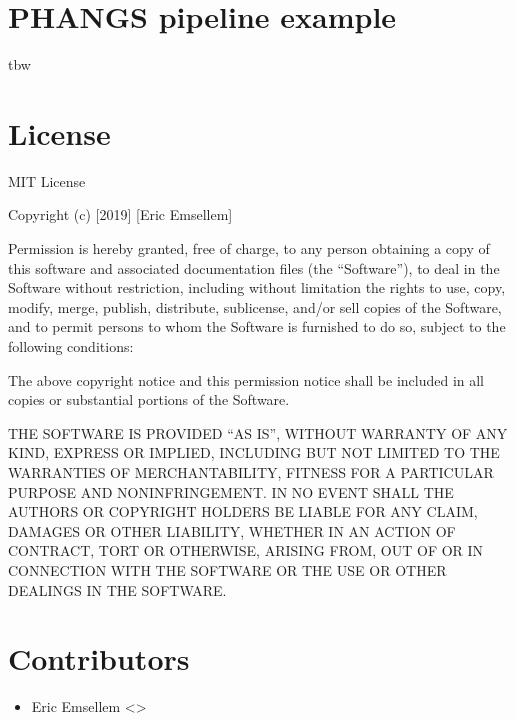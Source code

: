 \documentclass[letterpaper,10pt,english]{sphinxmanual}
\begin{document}
\sphinxstepscope


\section{PHANGS pipeline example}
\label{\detokenize{phangs_example:phangs-pipeline-example}}\label{\detokenize{phangs_example::doc}}
\sphinxAtStartPar
tbw

\sphinxstepscope


\section{License}
\label{\detokenize{license:license}}\label{\detokenize{license:id1}}\label{\detokenize{license::doc}}
\sphinxAtStartPar
MIT License

\sphinxAtStartPar
Copyright (c) {[}2019{]} {[}Eric Emsellem{]}

\sphinxAtStartPar
Permission is hereby granted, free of charge, to any person obtaining a copy
of this software and associated documentation files (the “Software”), to deal
in the Software without restriction, including without limitation the rights
to use, copy, modify, merge, publish, distribute, sublicense, and/or sell
copies of the Software, and to permit persons to whom the Software is
furnished to do so, subject to the following conditions:

\sphinxAtStartPar
The above copyright notice and this permission notice shall be included in all
copies or substantial portions of the Software.

\sphinxAtStartPar
THE SOFTWARE IS PROVIDED “AS IS”, WITHOUT WARRANTY OF ANY KIND, EXPRESS OR
IMPLIED, INCLUDING BUT NOT LIMITED TO THE WARRANTIES OF MERCHANTABILITY,
FITNESS FOR A PARTICULAR PURPOSE AND NONINFRINGEMENT. IN NO EVENT SHALL THE
AUTHORS OR COPYRIGHT HOLDERS BE LIABLE FOR ANY CLAIM, DAMAGES OR OTHER
LIABILITY, WHETHER IN AN ACTION OF CONTRACT, TORT OR OTHERWISE, ARISING FROM,
OUT OF OR IN CONNECTION WITH THE SOFTWARE OR THE USE OR OTHER DEALINGS IN THE
SOFTWARE.

\sphinxstepscope


\section{Contributors}
\label{\detokenize{authors:contributors}}\label{\detokenize{authors:authors}}\label{\detokenize{authors::doc}}\begin{itemize}
\item {} 
\sphinxAtStartPar
Eric Emsellem \textless{}\textgreater{}

\end{itemize}
\end{document}
